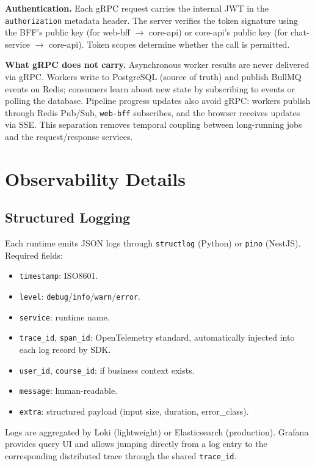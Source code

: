 \textbf{Authentication.} Each gRPC request carries the internal JWT in
the \texttt{authorization} metadata header. The server verifies the
token signature using the BFF's public key (for web-bff $\to$ core-api)
or core-api's public key (for chat-service $\to$ core-api). Token
scopes determine whether the call is permitted.

\textbf{What gRPC does not carry.} Asynchronous worker results are
never delivered via gRPC. Workers write to PostgreSQL (source of truth)
and publish BullMQ events on Redis; consumers learn about new state by
subscribing to events or polling the database. Pipeline progress
updates also avoid gRPC: workers publish through Redis Pub/Sub,
\texttt{web-bff} subscribes, and the browser receives updates via SSE.
This separation removes temporal coupling between long-running jobs and
the request/response services.

\section{Observability Details}
\label{appendix:observability-details}

\subsection{Structured Logging}

Each runtime emits JSON logs through \texttt{structlog} (Python) or
\texttt{pino} (NestJS). Required fields:

\begin{itemize}
    \item \texttt{timestamp}: ISO8601.
    \item \texttt{level}: \texttt{debug}/\texttt{info}/\texttt{warn}/\texttt{error}.
    \item \texttt{service}: runtime name.
    \item \texttt{trace\_id}, \texttt{span\_id}: OpenTelemetry standard,
          automatically injected into each log record by SDK.
    \item \texttt{user\_id}, \texttt{course\_id}: if business context
          exists.
    \item \texttt{message}: human-readable.
    \item \texttt{extra}: structured payload (input size, duration,
          error\_class).
\end{itemize}

Logs are aggregated by Loki (lightweight) or Elasticsearch (production).
Grafana provides query UI and allows jumping directly from a log entry to
the corresponding distributed trace through the shared \texttt{trace\_id}.

